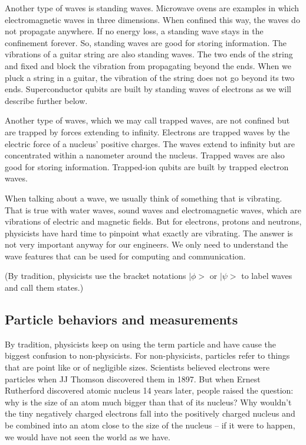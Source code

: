 \documentclass{book}
\begin{document}
Another type of waves is standing waves. Microwave ovens are examples in which electromagnetic waves in three dimensions.  When confined this way, the waves do not propagate anywhere. If no energy loss, a standing wave stays in the confinement forever. So, standing waves are good for storing information. The vibrations of a guitar string are also standing waves. The two ends of the string and fixed and block the vibration from propagating beyond the ends. When we pluck a string in a guitar, the vibration of the string does not go beyond its two ends. Superconductor qubits are built by standing waves of electrons as we will describe further below.

Another type of waves, which we may call trapped waves, are not confined but are trapped by forces extending to infinity. Electrons are trapped waves by the electric force of a nucleus' positive charges. The waves extend to infinity but are concentrated within a nanometer around the nucleus. Trapped waves are also good for storing information. Trapped-ion qubits are built by trapped electron waves.

When talking about a wave, we usually think of something that is vibrating. That is true with water waves, sound waves and electromagnetic waves, which are vibrations of electric and magnetic fields. But for electrons, protons and neutrons, physicists have hard time to pinpoint what exactly are vibrating. The answer is not very important anyway for our engineers. We only need to understand the wave features that can be used for computing and communication.

(By tradition, physicists use the bracket notations $|\phi>$ or $|\psi>$ to label waves and call them states.)

\subsection{Particle behaviors and measurements}
By tradition, physicists keep on using the term particle and have cause the biggest confusion to non-physicists. For non-physicists, particles refer to things that are point like or of negligible sizes. Scientists believed electrons were particles when JJ Thomson discovered them in 1897. But when Ernest Rutherford discovered atomic nucleus 14 years later, people raised the question: why is the size of an atom much bigger than that of its nucleus? Why wouldn't the tiny negatively charged electrons fall into the positively charged nucleus and be combined into an atom close to the size of the nucleus -- if it were to happen, we would have not seen the world as we have.
\end{document}
